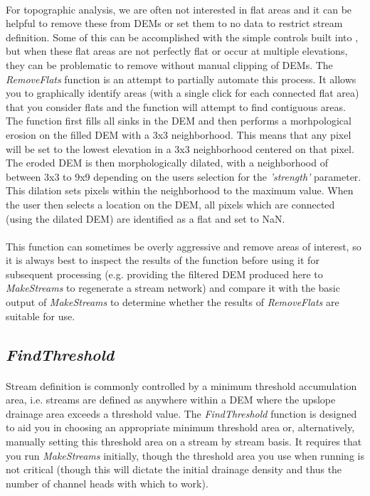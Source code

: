 \paragraph{}For topographic analysis, we are often not interested in flat areas and it can be helpful to remove these from DEMs or set them to no data to restrict stream definition. Some of this can be accomplished with the simple controls built into , but when these flat areas are not perfectly flat or occur at multiple elevations, they can be problematic to remove without manual clipping of DEMs. The \textit{RemoveFlats} function is an attempt to partially automate this process. It allows you to graphically identify areas (with a single click for each connected flat area) that you consider flats and the function will attempt to find contiguous areas. The function first fills all sinks in the DEM and then performs a morhpological erosion on the filled DEM with a 3x3 neighborhood. This means that any pixel will be set to the lowest elevation in a 3x3 neighborhood centered on that pixel. The eroded DEM is then morphologically dilated, with a neighborhood of between 3x3 to 9x9 depending on the users selection for the \textit{'strength'} parameter. This dilation sets pixels within the neighborhood to the maximum value. When the user then selects a location on the DEM, all pixels which are connected (using the dilated DEM) are identified as a flat and set to NaN.

\paragraph{}This function can sometimes be overly aggressive and remove areas of interest, so it is always best to inspect the results of the function before using it for subsequent processing (e.g. providing the filtered DEM produced here to \textit{MakeStreams} to regenerate a stream network) and compare it with the basic output of \textit{MakeStreams} to determine whether the results of \textit{RemoveFlats} are suitable for use.

\subsection{\textit{FindThreshold}} \label{sec:FindThresh}

\paragraph{}Stream definition is commonly controlled by a minimum threshold accumulation area, i.e. streams are defined as anywhere within a DEM where the upslope drainage area exceeds a threshold value. The \textit{FindThreshold} function is designed to aid you in choosing an appropriate minimum threshold area or, alternatively, manually setting this threshold area on a stream by stream basis. It requires that you run \textit{MakeStreams} initially, though the threshold area you use when running  is not critical (though this will dictate the initial drainage density and thus the number of channel heads with which to work). 

